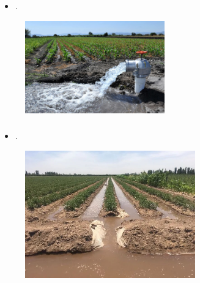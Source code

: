 \begin{frame}
	\frametitle{\secname}
	\begin{minipage}{0.6\textwidth}
		\begin{itemize}
			\item .
		\end{itemize}
	\end{minipage}
	\begin{minipage}{0.37\textwidth}
		\begin{figure}[ht!]
			\centering
			\includegraphics[height=4cm]{wasted_water}
		\end{figure}
	\end{minipage}
\end{frame}

\begin{frame}
	\frametitle{\secname}
	\begin{minipage}{0.5\textwidth}
		\begin{itemize}
			\item .
		\end{itemize}
	\end{minipage}
	\begin{minipage}{0.47\textwidth}
		\begin{figure}[ht!]
			\centering
			\includegraphics[height=5.5cm]{water_waster2}
		\end{figure}
	\end{minipage}
\end{frame}

